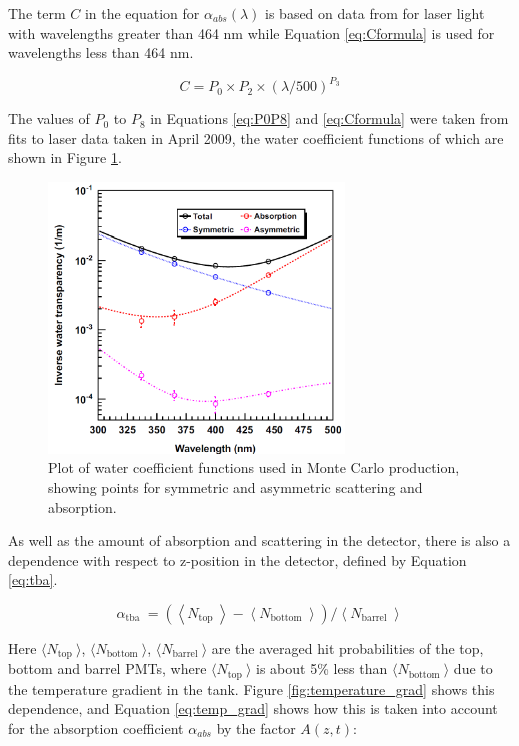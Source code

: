 The term $C$ in the equation for $\alpha_{abs}(\lambda)$ is based on data from \cite{Pope:97} for laser light with wavelengths greater than 464 nm while Equation \ref{eq:Cformula} is used for wavelengths less than 464 nm. 

\begin{equation}
C=P_{0} \times P_{2} \times(\lambda / 500)^{P_{3}}
\label{eq:Cformula}
\end{equation}

The values of $P_{0}$ to $P_{8}$ in Equations \ref{eq:P0P8} and \ref{eq:Cformula} were taken from fits to laser data taken in April 2009, the water coefficient functions of which are shown in Figure \ref{fig:water_coeff_plot}. 

\begin{figure}
    \centering
    \includegraphics[width=0.7\textwidth]{Figures/water_coeff_plot.png}
    \caption{Plot of water coefficient functions used in Monte Carlo production, showing points for symmetric and asymmetric scattering and absorption.}
    \label{fig:water_coeff_plot}
\end{figure}

As well as the amount of absorption and scattering in the detector, there is also a dependence with respect to z-position in the detector, defined by Equation \ref{eq:tba}.

\begin{equation}
    \alpha_{\text {tba }}=\left(\left\langle N_{\text {top }}\right\rangle-\left\langle N_{\text {bottom }}\right\rangle\right) /\left\langle N_{\text {barrel }}\right\rangle
    \label{eq:tba}   
\end{equation}

Here $\langle N_{\text {top }}\rangle$, $\langle N_{\text {bottom }}\rangle$, $\langle N_{\text {barrel }}\rangle$  are the averaged hit probabilities of the top, bottom and barrel PMTs, where  $\langle N_{\text {top }}\rangle$ is about 5\% less than $\langle N_{\text {bottom }}\rangle$ due to the temperature gradient in the tank. Figure \ref{fig:temperature_grad} shows this dependence, and Equation \ref{eq:temp_grad} shows how this is taken into account for the absorption coefficient $\alpha_{abs}$ by the factor $A(z,t)$:

